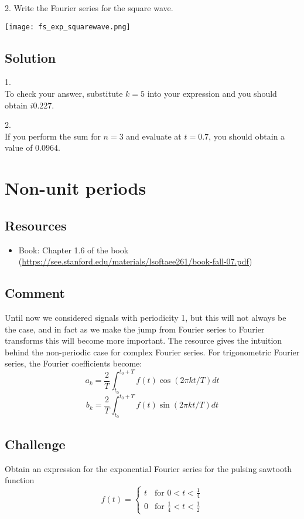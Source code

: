 2. Write the Fourier series for the square wave.

\texttt{[image: fs\_exp\_squarewave.png]}

\subsection*{Solution}
1.\\
To check your answer, substitute $k=5$ into your expression and you should obtain $i 0.227$.

2.\\
If you perform the sum for $n=3$ and evaluate at $t=0.7$, you should obtain a value of $0.0964$.




\newpage
\section{Non-unit periods}

\subsection*{Resources}
\begin{itemize}
    \item Book: Chapter 1.6 of the book (\url{https://see.stanford.edu/materials/lsoftaee261/book-fall-07.pdf})
\end{itemize}

\subsection*{Comment}
Until now we considered signals with periodicity 1, but this will not always be the case, and in fact as we make the jump from Fourier series to Fourier transforms this will become more important. The resource gives the intuition behind the non-periodic case for complex Fourier series. For trigonometric Fourier series, the Fourier coefficients become:
\begin{equation}
    a_k = \frac{2}{T} \int_{t_0}^{t_0+T} f(t) \cos(2 \pi k t/T) dt
\end{equation}
\begin{equation}
    b_k = \frac{2}{T} \int_{t_0}^{t_0+T} f(t) \sin(2 \pi k t/T) dt
\end{equation}

\subsection*{Challenge}
Obtain an expression for the exponential Fourier series for the pulsing sawtooth function
\begin{equation}
    f(t)=
    \begin{cases}
        t & \text{for } 0<t<\frac{1}{4} \\
        0 & \text{for } \frac{1}{4}<t<\frac{1}{2}
    \end{cases}
\end{equation}

